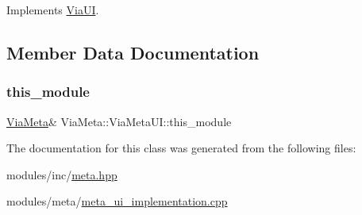 Implements \mbox{\hyperlink{class_via_u_i_a4bd3d575f4efe1273d6e4645454ead52}{Via\+UI}}.



\subsection{Member Data Documentation}
\mbox{\label{class_via_meta_1_1_via_meta_u_i_a8798ab0a875a443e05fc0954d849742c}} 
\subsubsection{\texorpdfstring{this\+\_\+module}{this\_module}}
{\footnotesize\ttfamily \mbox{\hyperlink{class_via_meta}{Via\+Meta}}\& Via\+Meta\+::\+Via\+Meta\+U\+I\+::this\+\_\+module}



The documentation for this class was generated from the following files\+:\begin{DoxyCompactItemize}
\item 
modules/inc/\mbox{\hyperlink{meta_8hpp}{meta.\+hpp}}\item 
modules/meta/\mbox{\hyperlink{meta__ui__implementation_8cpp}{meta\+\_\+ui\+\_\+implementation.\+cpp}}\end{DoxyCompactItemize}
